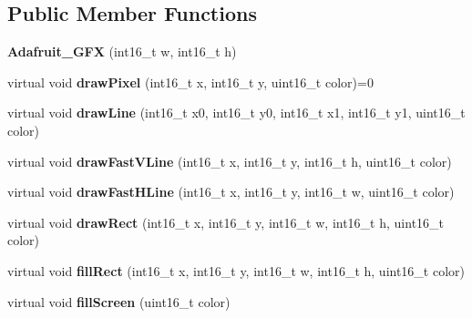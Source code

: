 \subsection*{Public Member Functions}
\begin{DoxyCompactItemize}
\item 
\hypertarget{class_adafruit___g_f_x_a6f6f1abccf677eac244fa17d105133ea}{}{\bfseries Adafruit\+\_\+\+G\+F\+X} (int16\+\_\+t w, int16\+\_\+t h)\label{class_adafruit___g_f_x_a6f6f1abccf677eac244fa17d105133ea}

\item 
\hypertarget{class_adafruit___g_f_x_ab7fbf72885c873266f9c7eb53b5c8896}{}virtual void {\bfseries draw\+Pixel} (int16\+\_\+t x, int16\+\_\+t y, uint16\+\_\+t color)=0\label{class_adafruit___g_f_x_ab7fbf72885c873266f9c7eb53b5c8896}

\item 
\hypertarget{class_adafruit___g_f_x_aa0ff662c2b2b48c3bac51f98c777776d}{}virtual void {\bfseries draw\+Line} (int16\+\_\+t x0, int16\+\_\+t y0, int16\+\_\+t x1, int16\+\_\+t y1, uint16\+\_\+t color)\label{class_adafruit___g_f_x_aa0ff662c2b2b48c3bac51f98c777776d}

\item 
\hypertarget{class_adafruit___g_f_x_a1cffbb1d69c5faf49cd0cff27686a837}{}virtual void {\bfseries draw\+Fast\+V\+Line} (int16\+\_\+t x, int16\+\_\+t y, int16\+\_\+t h, uint16\+\_\+t color)\label{class_adafruit___g_f_x_a1cffbb1d69c5faf49cd0cff27686a837}

\item 
\hypertarget{class_adafruit___g_f_x_a4d42e7cc577c1eb5b06fe656786c9c79}{}virtual void {\bfseries draw\+Fast\+H\+Line} (int16\+\_\+t x, int16\+\_\+t y, int16\+\_\+t w, uint16\+\_\+t color)\label{class_adafruit___g_f_x_a4d42e7cc577c1eb5b06fe656786c9c79}

\item 
\hypertarget{class_adafruit___g_f_x_a9ec2c2ab426503e4f7deddb93bb916f6}{}virtual void {\bfseries draw\+Rect} (int16\+\_\+t x, int16\+\_\+t y, int16\+\_\+t w, int16\+\_\+t h, uint16\+\_\+t color)\label{class_adafruit___g_f_x_a9ec2c2ab426503e4f7deddb93bb916f6}

\item 
\hypertarget{class_adafruit___g_f_x_aa43cf1dfe6c17d040a0f1fd5ffbe9d69}{}virtual void {\bfseries fill\+Rect} (int16\+\_\+t x, int16\+\_\+t y, int16\+\_\+t w, int16\+\_\+t h, uint16\+\_\+t color)\label{class_adafruit___g_f_x_aa43cf1dfe6c17d040a0f1fd5ffbe9d69}

\item 
\hypertarget{class_adafruit___g_f_x_a2b2730aaf2208990928f9c0f85558527}{}virtual void {\bfseries fill\+Screen} (uint16\+\_\+t color)\label{class_adafruit___g_f_x_a2b2730aaf2208990928f9c0f85558527}


\end{DoxyCompactItemize}
